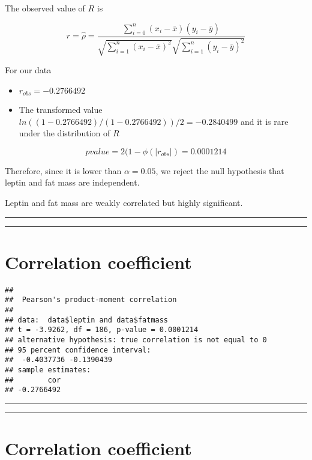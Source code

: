 \documentclass[
]{book}
\begin{document}
The observed value of \(R\) is

\[r=\hat{\rho}=\frac{\sum_{i=0}^n(x_i-\bar{x})(y_i-\bar{y})}{\sqrt{\sum_{i=1}^n(x_i-\bar{x})^2}\sqrt{\sum_{i=1}^n(y_i-\bar{y})^2}}\]

For our data

\begin{itemize}
\item
  \(r_{obs}=-0.2766492\)
\item
  The transformed value \(ln((1-0.2766492)/(1-0.2766492))/2=-0.2840499\) and it is rare under the distribution of \(R\)
\end{itemize}

\[pvalue=2(1- \phi(|r_{obs}|)=0.0001214\]

Therefore, since it is lower than \(\alpha=0.05\), we reject the null hypothesis that leptin and fat mass are independent.

Leptin and fat mass are weakly correlated but highly significant.

\begin{center}\rule{0.5\linewidth}{0.5pt}\end{center}

\begin{center}\rule{0.5\linewidth}{0.5pt}\end{center}

\hypertarget{correlation-coefficient-1}{%
\section{Correlation coefficient}\label{correlation-coefficient-1}}

\begin{verbatim}
## 
##  Pearson's product-moment correlation
## 
## data:  data$leptin and data$fatmass
## t = -3.9262, df = 186, p-value = 0.0001214
## alternative hypothesis: true correlation is not equal to 0
## 95 percent confidence interval:
##  -0.4037736 -0.1390439
## sample estimates:
##        cor 
## -0.2766492
\end{verbatim}

\begin{center}\rule{0.5\linewidth}{0.5pt}\end{center}

\begin{center}\rule{0.5\linewidth}{0.5pt}\end{center}

\hypertarget{correlation-coefficient-2}{%
\section{Correlation coefficient}\label{correlation-coefficient-2}}
\end{document}

